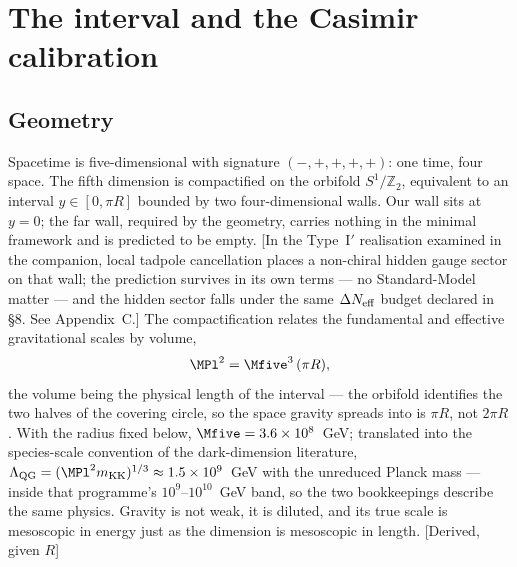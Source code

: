 \section{The interval and the Casimir calibration}
\subsection{Geometry}
Spacetime is five-dimensional with signature $(-,+,+,+,+)$: one time, four space. The fifth dimension is compactified on the orbifold $S^{1}/\mathbb{Z}_{2}$, equivalent to an interval $y\in[0,\pi R]$ bounded by two four-dimensional walls. Our wall sits at $y=0$; the far wall, required by the geometry, carries nothing in the minimal framework and is predicted to be empty. [In the Type~I$'$ realisation examined in the companion, local tadpole cancellation places a non-chiral hidden gauge sector on that wall; the prediction survives in its own terms --- no Standard-Model matter --- and the hidden sector falls under the same $\Delta N_{\rm eff}$ budget declared in \S8. See Appendix~C.] The compactification relates the fundamental and effective gravitational scales by volume,
\begin{equation}
\MPl^{2}=\Mfive^{3}\,(\pi R),
\label{eq:volume}
\end{equation}
the volume being the physical length of the interval --- the orbifold identifies the two halves of the covering circle, so the space gravity spreads into is $\pi R$, not $2\pi R$. With the radius fixed below, $\Mfive=3.6\times10^{8}$~GeV; translated into the species-scale convention of the dark-dimension literature, $\Lambda_{\rm QG}=(\MPl^{2}m_{\rm KK})^{1/3}\approx1.5\times10^{9}$~GeV with the unreduced Planck mass --- inside that programme's $10^{9}$--$10^{10}$~GeV band, so the two bookkeepings describe the same physics. Gravity is not weak, it is diluted, and its true scale is mesoscopic in energy just as the dimension is mesoscopic in length. [Derived, given $R$]

